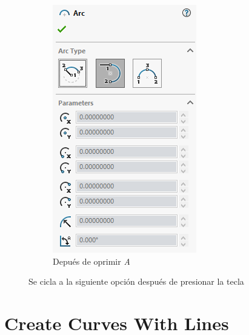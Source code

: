 \documentclass[12pt,letterpaper,final]{report}
\begin{document}
\begin{figure}[H]
\begin{subfigure}[b]{0.35\textwidth}
		\includegraphics[width=\textwidth]{Imagenes/solidworks_ciclarcona02}
		\caption{Depués de oprimir \emph{A}}
		\label{fig:solidworksciclarcona02}
	\end{subfigure}
	\caption{Se cicla a la siguiente opción después de presionar la tecla}
\end{figure}

\chapter{Create Curves With Lines}
\end{document}
